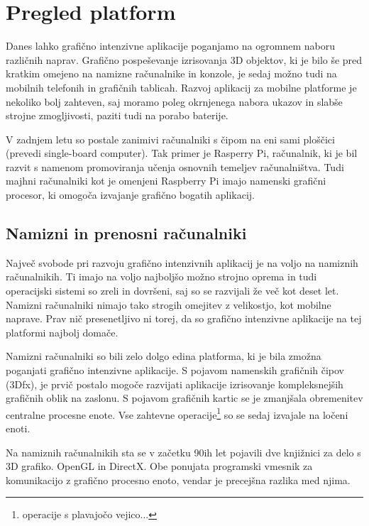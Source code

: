 \chapter{Pregled platform}

Danes lahko grafično intenzivne aplikacije poganjamo na ogromnem naboru različnih naprav. Grafično pospeševanje izrisovanja 3D objektov, ki je bilo še pred kratkim omejeno na namizne računalnike in konzole, je sedaj možno tudi na mobilnih telefonih in grafičnih tablicah. Razvoj aplikacij za mobilne platforme je nekoliko bolj zahteven, saj moramo poleg okrnjenega nabora ukazov in slabše strojne zmogljivosti, paziti tudi na porabo baterije.

V zadnjem letu so postale zanimivi računalniki s čipom na eni sami ploščici (prevedi single-board computer). Tak primer je Rasperry Pi, računalnik, ki je bil razvit s namenom promoviranja učenja osnovnih temeljev računalništva. Tudi majhni računalniki kot je omenjeni Raspberry Pi imajo namenski grafični procesor, ki omogoča izvajanje grafično bogatih aplikacij.

\section{Namizni in prenosni računalniki}

Največ svobode pri razvoju grafično intenzivnih aplikacij je na voljo na namiznih računalnikih. Ti imajo na voljo najboljšo možno strojno oprema in tudi operacijski sistemi so zreli in dovršeni, saj so se razvijali že več kot deset let. Namizni računalniki nimajo tako strogih omejitev z velikostjo, kot mobilne naprave. Prav nič presenetljivo ni torej, da so grafično intenzivne aplikacije na tej platformi najbolj domače. 

Namizni računalniki so bili zelo dolgo edina platforma, ki je bila zmožna poganjati grafično intenzivne aplikacije. S pojavom namenskih grafičnih čipov (3Dfx), je prvič postalo mogoče razvijati aplikacije izrisovanje kompleksnejših grafičnih oblik na zaslonu. S pojavom grafičnih kartic se je zmanjšala obremenitev centralne procesne enote. Vse zahtevne operacije\footnote{operacije s plavajočo vejico...} so se sedaj izvajale na ločeni enoti. 

Na namiznih računalnikih sta se v začetku 90ih let pojavili dve knjižnici za delo s 3D grafiko. OpenGL in DirectX. Obe ponujata programski vmesnik za komunikacijo z grafično procesno enoto, vendar je precejšna razlika med njima.




